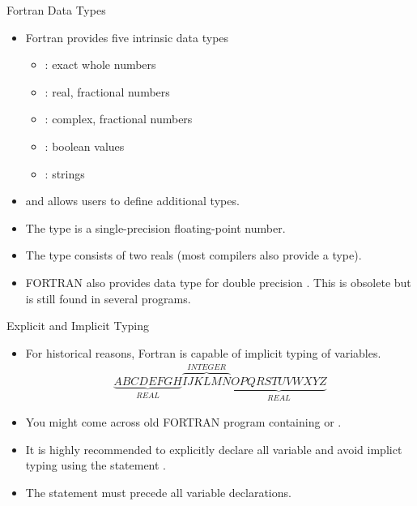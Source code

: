 \documentclass[10pt,t]{beamer}
\begin{document}
\begin{frame}[fragile]{Fortran Data Types}
  \begin{itemize}
  \item Fortran provides five intrinsic data types
    \begin{itemize}
    \item[] : exact whole numbers
    \item[] : real, fractional numbers
    \item[] : complex, fractional numbers
    \item[] : boolean values
    \item[] : strings
    \end{itemize}
  \item and allows users to define additional types.
  \item The  type is a single-precision floating-point number.
  \item The  type consists of two reals (most compilers also provide a  type).
  \item FORTRAN also provides  data type for double precision . This is obsolete but is still found in several programs.
  \end{itemize}
\end{frame}

\begin{frame}{Explicit and Implicit Typing}
  \begin{itemize}
  \item For historical reasons, Fortran is capable of implicit typing of variables.
    \begin{gather*}
      \underbrace{ABCDEFGH}_{REAL}\overbrace{IJKLMN}^{INTEGER}\underbrace{OPQRSTUVWXYZ}_{REAL}
    \end{gather*}
  \item You might come across old FORTRAN program containing  or .
  \item It is highly recommended to explicitly declare all variable and avoid implict typing using the statement .
  \item The  statement must precede all variable declarations.
  \end{itemize}
\end{frame}
\end{document}
